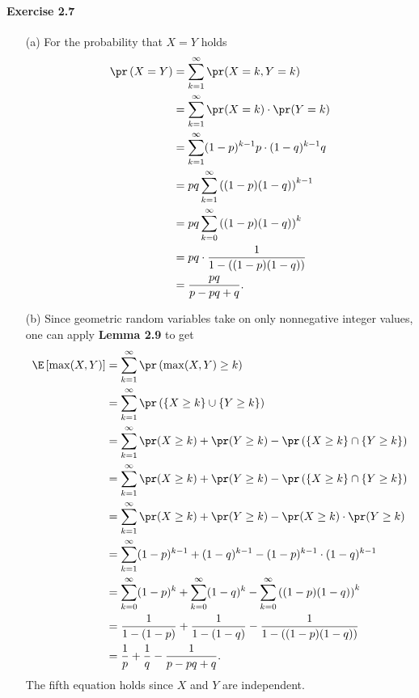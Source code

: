 \paragraph{Exercise 2.7}
\begin{enumerate}
  \item[(a)] For the probability that $X = Y$ holds
  \begin{align*}
    \pr\left( X = Y \right)
      &= \sum_{k=1}^{\infty} \pr(X = k, Y = k) \\
      &= \sum_{k=1}^{\infty} \pr(X = k) \cdot \pr(Y = k) \\
      &= \sum_{k=1}^{\infty} (1-p)^{k-1}p \cdot (1-q)^{k-1} q \\
      &= pq \sum_{k=1}^{\infty} \left((1-p)(1-q)\right)^{k-1} \\
      &= pq \sum_{k=0}^{\infty} \left((1-p)(1-q)\right)^{k} \\
      &= pq \cdot \frac{1}{1- \left( (1-p)(1-q)\right)} \\
      &= \frac{pq}{p - pq + q}.
  \end{align*}

  \item[(b)] Since geometric random variables take on only nonnegative integer
  values, one can apply \textbf{Lemma 2.9} to get
  \begin{align*}
    \E\left[ \max(X,Y) \right]
    &= \sum_{k=1}^{\infty} \pr\left( \max(X,Y) \geq k \right) \\
    &= \sum_{k=1}^{\infty} \pr\left( \{ X \geq k \} \cup \{ Y \geq k \} \right) \\
    &= \sum_{k=1}^{\infty} \pr(X \geq k) + \pr(Y \geq k) - \pr\left( \{ X \geq k \} \cap \{ Y \geq k \} \right) \\
    &= \sum_{k=1}^{\infty} \pr(X \geq k) + \pr(Y \geq k) - \pr\left( \{ X \geq k \} \cap \{ Y \geq k \} \right) \\
    &= \sum_{k=1}^{\infty} \pr(X \geq k) + \pr(Y \geq k) - \pr(X \geq k) \cdot \pr(Y \geq k) \\
    &= \sum_{k=1}^{\infty} (1-p)^{k-1} + (1-q)^{k-1} - (1-p)^{k-1} \cdot (1-q)^{k-1} \\
    &= \sum_{k=0}^{\infty} (1-p)^{k} + \sum_{k=0}^{\infty} (1-q)^{k} - \sum_{k=0}^{\infty} \left((1-p)(1-q)\right)^{k}\\
    &= \frac{1}{1-(1-p)} + \frac{1}{1-(1-q)} - \frac{1}{1-\left((1-p)(1-q)\right)} \\
    &= \frac{1}{p} + \frac{1}{q} - \frac{1}{p - pq + q}.
  \end{align*}
  The fifth equation holds since $X$ and $Y$ are independent.


\end{enumerate}
